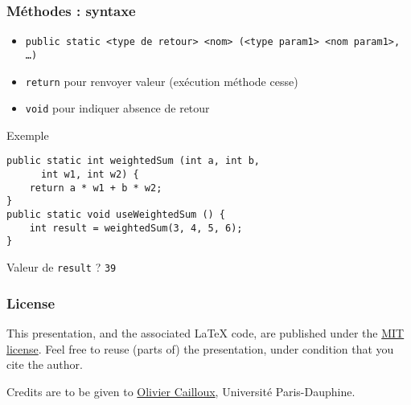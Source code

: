 \documentclass[english, french]{beamer}
\begin{document}
\begin{frame}[fragile]
	\frametitle{Méthodes : syntaxe}
	\begin{itemize}
		\item \texttt{public static <type de retour> <nom> (<type param1> <nom param1>, …)}
		\item \texttt{return} pour renvoyer valeur (exécution méthode cesse)
		\item \texttt{void} pour indiquer absence de retour
	\end{itemize}
	\begin{block}{Exemple}
		\begin{lstlisting}
public static int weightedSum (int a, int b, 
      int w1, int w2) {
	return a * w1 + b * w2;
}
public static void useWeightedSum () {
	int result = weightedSum(3, 4, 5, 6);
}
		\end{lstlisting}	
	\end{block}
	Valeur de \texttt{result} ? \pause \texttt{39}
\end{frame}

\appendix
\makeatletter
\def\insertframenumber{\@roman\c@framenumber}
\def\inserttotalframenumber{\@roman\c@framenumber}
\makeatother
\AtBeginSection{
}

\clearpage{}
\begin{frame}[plain]
	\frametitle{License}
	This presentation, and the associated \LaTeX{} code, are published under the \href{http://opensource.org/licenses/MIT}{MIT license}. Feel free to reuse (parts of) the presentation, under condition that you cite the author.
	
	Credits are to be given to \href{http://www.lamsade.dauphine.fr/~ocailloux/}{Olivier Cailloux}, Université Paris-Dauphine.
\end{frame}
\addtocounter{framenumber}{-1}
\end{document}
